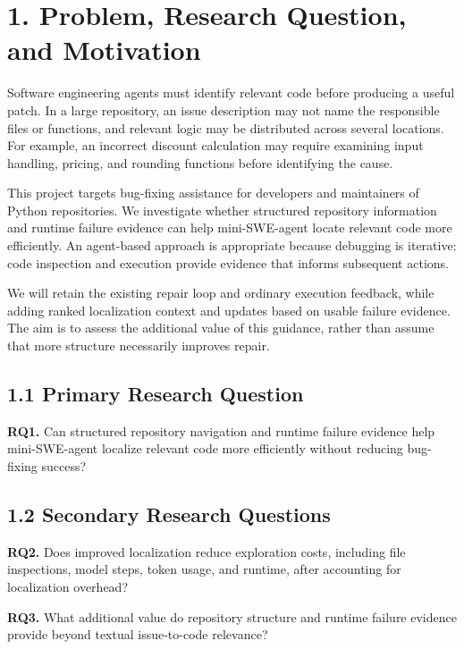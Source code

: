 \documentclass[11pt]{article}
\begin{document}
\section*{1. Problem, Research Question, and Motivation}

Software engineering agents must identify relevant code before producing
a useful patch. In a large repository, an issue description may not name
the responsible files or functions, and relevant logic may be distributed
across several locations. For example, an incorrect discount calculation
may require examining input handling, pricing, and rounding functions
before identifying the cause.

This project targets bug-fixing assistance for developers and maintainers
of Python repositories. We investigate whether structured repository
information and runtime failure evidence can help mini-SWE-agent
\cite{minisweagent} locate relevant code more efficiently. An agent-based
approach is appropriate because debugging is iterative: code inspection
and execution provide evidence that informs subsequent actions.

We will retain the existing repair loop and ordinary execution feedback,
while adding ranked localization context and updates based on usable
failure evidence. The aim is to assess the additional value of this
guidance, rather than assume that more structure necessarily improves
repair.

\subsection*{1.1 Primary Research Question}

\textbf{RQ1.}
Can structured repository navigation and runtime failure evidence help
mini-SWE-agent localize relevant code more efficiently without reducing
bug-fixing success?

\subsection*{1.2 Secondary Research Questions}

\textbf{RQ2.}
Does improved localization reduce exploration costs, including file
inspections, model steps, token usage, and runtime, after accounting for
localization overhead?

\vspace{0.5em}

\textbf{RQ3.}
What additional value do repository structure and runtime failure evidence
provide beyond textual issue-to-code relevance?
\end{document}
